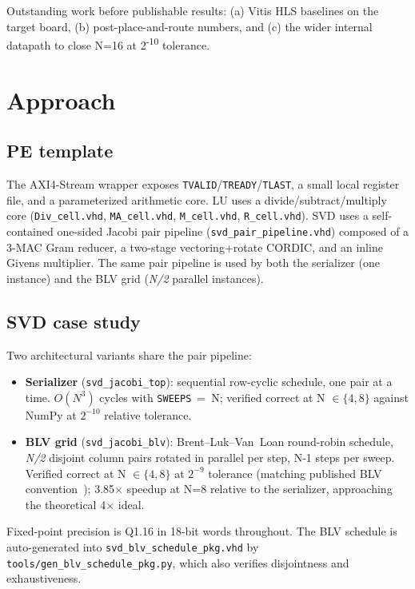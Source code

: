 \documentclass[11pt,letterpaper]{article}
\newcommand{\ttp}[1]{\texttt{\small #1}}
\begin{document}
Outstanding work before publishable results: (a) Vitis HLS baselines on the target board, (b) post-place-and-route numbers, and (c) the wider internal datapath to close N=16 at 2\textsuperscript{-10} tolerance.

\section{Approach}

\subsection{PE template}

The AXI4-Stream wrapper exposes \ttp{TVALID}/\ttp{TREADY}/\ttp{TLAST}, a small local register file, and a parameterized arithmetic core. LU uses a divide/subtract/multiply core (\ttp{Div\_cell.vhd}, \ttp{MA\_cell.vhd}, \ttp{M\_cell.vhd}, \ttp{R\_cell.vhd}). SVD uses a self-contained one-sided Jacobi pair pipeline (\ttp{svd\_pair\_pipeline.vhd}) composed of a 3-MAC Gram reducer, a two-stage vectoring+rotate CORDIC, and an inline Givens multiplier. The same pair pipeline is used by both the serializer (one instance) and the BLV grid (\emph{N/2} parallel instances).

\subsection{SVD case study}

Two architectural variants share the pair pipeline:

\begin{itemize}
  \item \textbf{Serializer} (\ttp{svd\_jacobi\_top}): sequential row-cyclic schedule, one pair at a time. $O(N^3)$ cycles with \ttp{SWEEPS}~=~N; verified correct at N $\in \{4, 8\}$ against NumPy at $2^{-10}$ relative tolerance.
  \item \textbf{BLV grid} (\ttp{svd\_jacobi\_blv}): Brent--Luk--Van~Loan round-robin schedule, \emph{N/2} disjoint column pairs rotated in parallel per step, N-1 steps per sweep. Verified correct at N $\in \{4, 8\}$ at $2^{-9}$ tolerance (matching published BLV convention~\cite{ma2006,hemkumar1994}); 3.85$\times$ speedup at N=8 relative to the serializer, approaching the theoretical 4$\times$ ideal.
\end{itemize}

Fixed-point precision is Q1.16 in 18-bit words throughout. The BLV schedule is auto-generated into \ttp{svd\_blv\_schedule\_pkg.vhd} by \ttp{tools/gen\_blv\_schedule\_pkg.py}, which also verifies disjointness and exhaustiveness.
\end{document}
